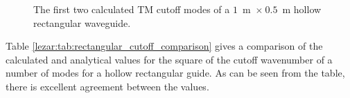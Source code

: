 \begin{figure}[ht]
\centering
\caption{The first two calculated TM cutoff modes of a $1$~m~$\times~0.5$~m hollow rectangular waveguide.}
\label{lezar:fig:rectangular_cutoff_TM}
\end{figure}
Table \ref{lezar:tab:rectangular_cutoff_comparison} gives a comparison of
the calculated and analytical values for the square of the cutoff
wavenumber of a number of modes for a hollow
rectangular guide. As can be seen from the table, there is excellent
agreement between the values.

